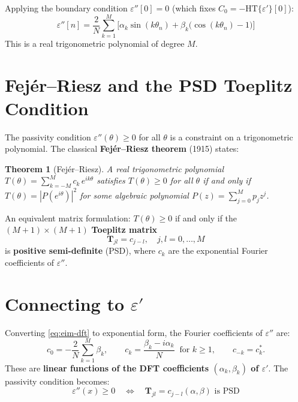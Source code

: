 \documentclass[11pt]{article}
\newtheorem{theorem}{Theorem}
\newcommand{\eps}{\varepsilon}
\begin{document}
Applying the boundary condition $\eps''[0] = 0$ (which fixes $C_0 = -\mathrm{HT}\{\eps'\}[0]$):
\begin{equation}\label{eq:eim-dft}
\boxed{\eps''[n] = \frac{2}{N}\sum_{k=1}^{M}\bigl[\alpha_k \sin(k\theta_n) + \beta_k\bigl(\cos(k\theta_n) - 1\bigr)\bigr]}
\end{equation}
This is a real trigonometric polynomial of degree $M$.

\section{Fej\'er--Riesz and the PSD Toeplitz Condition}

The passivity condition $\eps''(\theta) \geq 0$ for all $\theta$ is a constraint on a trigonometric polynomial.  The classical \textbf{Fej\'er--Riesz theorem} (1915) states:

\begin{theorem}[Fej\'er--Riesz]\label{thm:fejer-riesz}
A real trigonometric polynomial $T(\theta) = \sum_{k=-M}^{M} c_k\, e^{ik\theta}$ satisfies $T(\theta) \geq 0$ for all $\theta$ if and only if $T(\theta) = |P(e^{i\theta})|^2$ for some algebraic polynomial $P(z) = \sum_{j=0}^{M} p_j z^j$.
\end{theorem}

An equivalent matrix formulation: $T(\theta) \geq 0$ if and only if the $(M{+}1) \times (M{+}1)$ \textbf{Toeplitz matrix}
\begin{equation}
\mathbf{T}_{jl} = c_{j-l}, \quad j,l = 0, \ldots, M
\end{equation}
is \textbf{positive semi-definite} (PSD), where $c_k$ are the exponential Fourier coefficients of $\eps''$.

\section{Connecting to $\eps'$}

Converting \eqref{eq:eim-dft} to exponential form, the Fourier coefficients of $\eps''$ are:
\begin{equation}
c_0 = -\frac{2}{N}\sum_{k=1}^{M}\beta_k, \qquad c_k = \frac{\beta_k - i\alpha_k}{N} \;\;\text{for } k \geq 1, \qquad c_{-k} = c_k^*.
\end{equation}
These are \textbf{linear functions of the DFT coefficients $(\alpha_k, \beta_k)$ of $\eps'$}.  The passivity condition becomes:
\begin{equation}
\boxed{\eps''(x) \geq 0 \quad\Longleftrightarrow\quad \mathbf{T}_{jl} = c_{j-l}(\alpha, \beta) \text{ is PSD}}
\end{equation}
\end{document}
